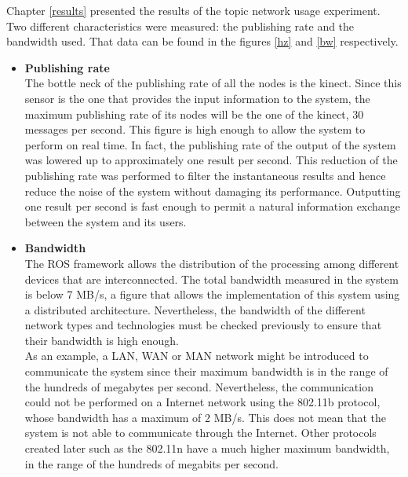 			Chapter \ref{results} presented the results of the topic network usage experiment. 
			Two different characteristics were measured: the publishing rate and the bandwidth used. 
			That data can be found in the figures \ref{hz} and \ref{bw} respectively. 
			\\

			\begin{itemize}
				\item{\textbf{Publishing rate}}\\

				The bottle neck of the publishing rate of all the nodes is the kinect. 
				Since this sensor is the one that provides the input information to the system, the maximum publishing rate of its nodes will be the one of the kinect, 30 messages per second.
				This figure is high enough to allow the system to perform on real time. 
				In fact, the publishing rate of the output of the system was lowered up to approximately one result per second.
				This reduction of the publishing rate was performed to filter the instantaneous results and hence reduce the noise of the system without damaging its performance.
				Outputting one result per second is fast enough to permit a natural information exchange between the system and its users.
\newpage
			\item{\textbf{Bandwidth}}\\

				The ROS framework allows the distribution of the processing among different devices that are interconnected. 
				The total bandwidth measured in the system is below 7 MB/s, a figure that allows the implementation of this system using a distributed architecture. 
				Nevertheless, the bandwidth of the different network types and technologies must be checked previously to ensure that their bandwidth is high enough. 
				\\

				As an example, a LAN, WAN or MAN network might be introduced to communicate the system since their maximum bandwidth is in the range of the hundreds of megabytes per second. 
				Nevertheless, the communication could not be performed on a Internet network using the 802.11b protocol, whose bandwidth has a maximum of 2 MB/s.
				This does not mean that the system is not able to communicate through the Internet. 
				Other protocols created later such as the 802.11n have a much higher maximum bandwidth, in the range of the hundreds of megabits per second.



		\end{itemize}

